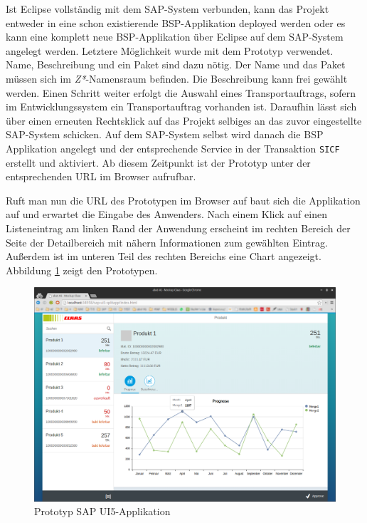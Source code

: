 Ist Eclipse vollständig mit dem SAP-System verbunden, kann das Projekt entweder in eine schon existierende BSP-Applikation deployed werden oder es kann eine komplett neue BSP-Applikation über Eclipse auf dem SAP-System angelegt werden. Letztere Möglichkeit wurde mit dem Prototyp verwendet. Name, Beschreibung und ein Paket sind dazu nötig. Der Name und das Paket müssen sich im \textit{Z*}-Namensraum befinden. Die Beschreibung kann frei gewählt werden. Einen Schritt weiter erfolgt die Auswahl eines Transportauftrags, sofern im Entwicklungssystem ein Transportauftrag vorhanden ist. Daraufhin lässt sich über einen erneuten Rechtsklick auf das Projekt selbiges an das zuvor eingestellte SAP-System schicken. Auf dem SAP-System selbst wird danach die BSP Applikation angelegt und der entsprechende Service in der Transaktion \texttt{SICF} erstellt und aktiviert. Ab diesem Zeitpunkt ist der Prototyp unter der entsprechenden URL im Browser aufrufbar.\par Ruft man nun die URL des Prototypen im Browser auf baut sich die Applikation auf und erwartet die Eingabe des Anwenders. Nach einem Klick auf einen Listeneintrag am linken Rand der Anwendung erscheint im rechten Bereich der Seite der Detailbereich mit nähern Informationen zum gewählten Eintrag. Außerdem ist im unteren Teil des rechten Bereichs eine Chart angezeigt. Abbildung \ref{fig:prototypsplitapp} zeigt den Prototypen.

\vspace{1em}
\begin{figure}[htb]
  \centering
  \includegraphics[width=1\linewidth]{abb/sapui5_final_splitapp}
  \caption[Prototyp SAP UI5-Applikation]{Prototyp SAP UI5-Applikation}
  \label{fig:prototypsplitapp}
\end{figure}